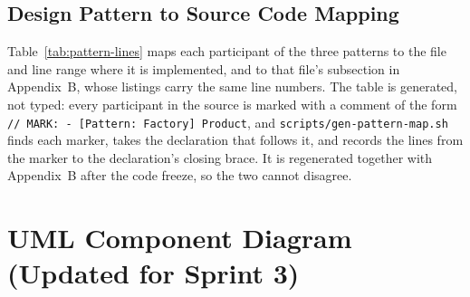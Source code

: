 \documentclass[12pt,letterpaper]{article}
\begin{document}
\subsection{Design Pattern to Source Code Mapping}\label{sec:patternmap}
Table~\ref{tab:pattern-lines} maps each participant of the three patterns to the file
and line range where it is implemented, and to that file's subsection in Appendix~B,
whose listings carry the same line numbers. The table is generated, not typed: every
participant in the source is marked with a comment of the form
\texttt{// MARK: - [Pattern: Factory] Product}, and \texttt{scripts/gen-pattern-map.sh}
finds each marker, takes the declaration that follows it, and records the lines from
the marker to the declaration's closing brace. It is regenerated together with
Appendix~B after the code freeze, so the two cannot disagree.

{\singlespacing\footnotesize

}

\section{UML Component Diagram (Updated for Sprint 3)}\label{sec:component}
\end{document}
